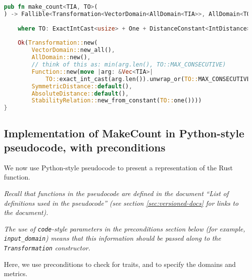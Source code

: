 \documentclass[12pt,letterpaper]{article}
\theoremstyle{definition}
\begin{document}
\begin{lstlisting}[language = Rust]
pub fn make_count<TIA, TO>(
) -> Fallible<Transformation<VectorDomain<AllDomain<TIA>>, AllDomain<TO>, SymmetricDistance, AbsoluteDistance<TO>>>
    
    where TO: ExactIntCast<usize> + One + DistanceConstant<IntDistance>, IntDistance: InfCast<TO> {
    
    Ok(Transformation::new(
        VectorDomain::new_all(),
        AllDomain::new(),
        // think of this as: min(arg.len(), TO::MAX_CONSECUTIVE)
        Function::new(move |arg: &Vec<TIA>|
            TO::exact_int_cast(arg.len()).unwrap_or(TO::MAX_CONSECUTIVE)),
        SymmetricDistance::default(),
        AbsoluteDistance::default(),
        StabilityRelation::new_from_constant(TO::one())))
}
\end{lstlisting}

\subsection{Implementation of MakeCount in Python-style pseudocode, with preconditions}
\label{sec:python-pseudocode}

We now use Python-style pseudocode to present a representation of the Rust function.

\emph{Recall that functions in the pseudocode are defined in the document ``List of definitions used in the pseudocode'' (see section \ref{sec:versioned-docs} for links to the document).}

\emph{The use of \texttt{code}-style parameters in the preconditions section below (for example, \texttt{input\_domain}) means that this information should be passed along to the \texttt{Transformation} constructor.}

Here, we use preconditions to check for traits, and to specify the domains and metrics.
\end{document}
